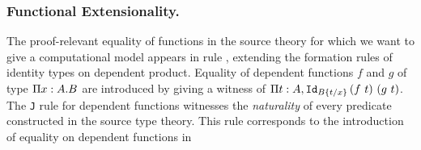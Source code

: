 \subsubsection{Functional Extensionality.} 
%
The proof-relevant equality of functions in the source theory for which we want to
give a computational model appears in rule ,
extending the formation rules of identity types on dependent product. 
%
Equality of dependent functions $f$ and $g$ of type $\Pi \vdecl{x}{A}\mdot B$ are
introduced by giving a witness of $\Pi t : A, \Id{B \{\subs x {t}\}}
{(f \ t)}{(g \ t)}$.
%
The \texttt{J} rule for dependent functions witnesses the
\emph{naturality} of every predicate constructed in the source type
theory.
%
This rule corresponds 
  to the introduction of equality on dependent functions in %

\def\hFin#1{\mathtt{\hat Fin}\ #1}
\def\Fin#1{\texttt{Fin}\ #1}
\def\fin#1#2{\underline{#1}_{#2}}




